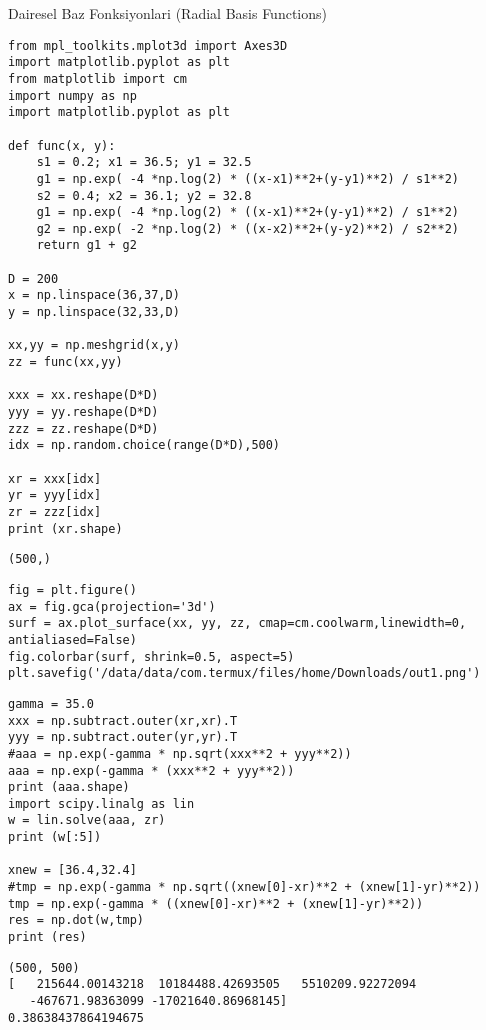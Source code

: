 \documentclass[12pt,fleqn]{article}\usepackage{../../common}
\begin{document}
Dairesel Baz Fonksiyonlari (Radial Basis Functions)

\begin{verbatim}
from mpl_toolkits.mplot3d import Axes3D
import matplotlib.pyplot as plt
from matplotlib import cm
import numpy as np
import matplotlib.pyplot as plt

def func(x, y):
    s1 = 0.2; x1 = 36.5; y1 = 32.5
    g1 = np.exp( -4 *np.log(2) * ((x-x1)**2+(y-y1)**2) / s1**2)
    s2 = 0.4; x2 = 36.1; y2 = 32.8
    g1 = np.exp( -4 *np.log(2) * ((x-x1)**2+(y-y1)**2) / s1**2)
    g2 = np.exp( -2 *np.log(2) * ((x-x2)**2+(y-y2)**2) / s2**2)
    return g1 + g2

D = 200
x = np.linspace(36,37,D)
y = np.linspace(32,33,D)

xx,yy = np.meshgrid(x,y)
zz = func(xx,yy)

xxx = xx.reshape(D*D)
yyy = yy.reshape(D*D)
zzz = zz.reshape(D*D)
idx = np.random.choice(range(D*D),500)

xr = xxx[idx]
yr = yyy[idx]
zr = zzz[idx]
print (xr.shape)
\end{verbatim}

\begin{verbatim}
(500,)
\end{verbatim}

\begin{verbatim}
fig = plt.figure()
ax = fig.gca(projection='3d')
surf = ax.plot_surface(xx, yy, zz, cmap=cm.coolwarm,linewidth=0, antialiased=False)
fig.colorbar(surf, shrink=0.5, aspect=5)
plt.savefig('/data/data/com.termux/files/home/Downloads/out1.png')
\end{verbatim}

\begin{verbatim}
gamma = 35.0
xxx = np.subtract.outer(xr,xr).T
yyy = np.subtract.outer(yr,yr).T
#aaa = np.exp(-gamma * np.sqrt(xxx**2 + yyy**2))
aaa = np.exp(-gamma * (xxx**2 + yyy**2))
print (aaa.shape)
import scipy.linalg as lin
w = lin.solve(aaa, zr)
print (w[:5])

xnew = [36.4,32.4]
#tmp = np.exp(-gamma * np.sqrt((xnew[0]-xr)**2 + (xnew[1]-yr)**2))
tmp = np.exp(-gamma * ((xnew[0]-xr)**2 + (xnew[1]-yr)**2))
res = np.dot(w,tmp)
print (res)
\end{verbatim}

\begin{verbatim}
(500, 500)
[   215644.00143218  10184488.42693505   5510209.92272094
   -467671.98363099 -17021640.86968145]
0.38638437864194675
\end{verbatim}
\end{document}
